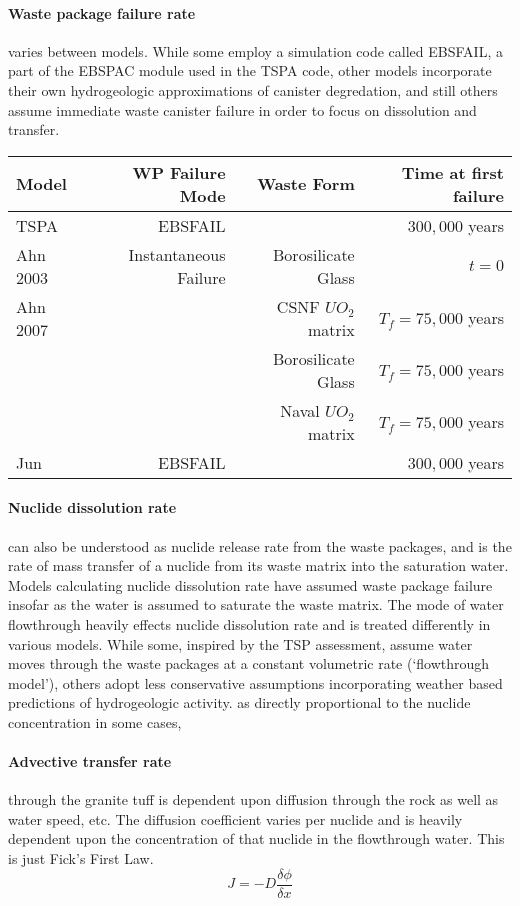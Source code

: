 \paragraph{Waste package failure rate} varies between models. While some employ a simulation code called EBSFAIL, a part of the EBSPAC module used in the TSPA code, other models incorporate their own hydrogeologic approximations of canister degredation, and still others assume immediate waste canister failure in order to focus on dissolution and transfer. 
\newline
\begin{centering}
\begin{table}
\begin{tabular}[h!bt]{l|r|r|r}
Model&WP Failure Mode&Waste Form&Time at first failure\\
\hline
TSPA&EBSFAIL&&$300,000$ years\\
\hline
Ahn 2003&Instantaneous Failure&Borosilicate Glass&$t=0$\\
\hline
Ahn 2007& &CSNF $UO_2$ matrix &$T_f=75,000$ years\\
& &Borosilicate Glass &$T_f=75,000$ years\\
& & Naval $UO_2$ matrix &$T_f=75,000$ years\\
\hline
Jun&EBSFAIL&&$300,000$ years\\
\end{tabular}
\end{table}
\end{centering}
\paragraph{Nuclide dissolution rate} can also be understood as nuclide release rate from the waste packages, and is the rate of mass transfer of a nuclide from its waste matrix into the saturation water. Models calculating  nuclide dissolution rate have assumed waste package failure insofar as the water is assumed to saturate the waste matrix. The mode of water flowthrough heavily effects nuclide dissolution rate and is treated differently in various models. While some, inspired by the TSP assessment, assume water moves through the waste packages at a constant volumetric rate (`flowthrough model'), others adopt less conservative assumptions incorporating weather based predictions of hydrogeologic activity. as directly proportional to the nuclide concentration in some cases,  
\paragraph{Advective transfer rate} through the granite tuff is dependent upon diffusion through the rock as well as water speed, etc. The diffusion coefficient varies per nuclide and is heavily dependent upon the concentration of that nuclide in the flowthrough water. This is just Fick's First Law. 
\begin{equation}
J = -D\frac{\delta\phi}{\delta x}
\end{equation}
